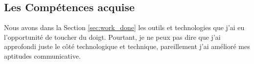 \subsection{Les Compétences acquise}
Nous avons dans la Section \ref{sec:work_done} les outils et technologies que j'ai eu l'opportunité de toucher du doigt.
Pourtant, je ne peux pas dire que j'ai approfondi juste le côté technologique et technique, pareillement j'ai amélioré mes aptitudes communicative.
